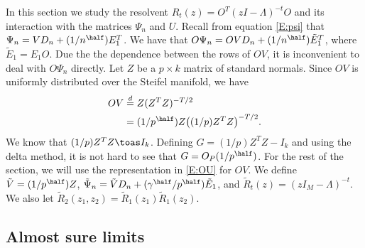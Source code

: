In this section we study the resolvent $R_t(z) = O^T (z I - \Lambda)^{-t} O$ 
and its interaction with the matrices $\Psi_n$ and $U$.  Recall from equation
\eqref{E:psi} that $\Psi_n = V D_n + (1/n^{\half}) E_1^T$.  We have that
$O \Psi_n = O V D_n + (1/n^{\half}) \tilde E_1^T$, where $\tilde E_1 = E_1 O$.
Due the the dependence between the rows of $O V$, it is inconvenient to
deal with $O \Psi_n$ directly.  Let $Z$ be a $p \times k$ matrix of \iid standard normals.  Since $O V$ is uniformly distributed over the Steifel manifold, we have
\begin{align}\label{E:OU}
    O V
        &\overset{d}{=} Z (Z^T Z)^{-T/2}  \notag \\
        &= (1/p^\half) Z \big((1/p) Z^T Z\big)^{-T/2}.  
\end{align}    
We know that
$(1/p) Z^T Z \toas I_k$.  Defining $G = (1/p) Z^T Z - I_k$ and using the
delta method, it is not hard to see that $G = O_P(1/p^\half)$.  For the rest
of the section, we will use the representation in \eqref{E:OU} for $OV$.  We
define $\tilde V = (1/p^\half) Z$,
$\tilde \Psi_n =  \tilde V D_n + (\gamma^{\half} / p^\half) \tilde E_1$,
and $\tilde R_t (z) = (z I_M - \Lambda)^{-t}$.  We also let 
$\tilde R_2(z_1, z_2) = \tilde R_1 (z_1) \tilde R_1 (z_2)$.


\subsection{Almost sure limits}

